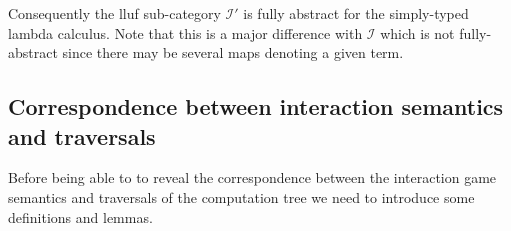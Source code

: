 Consequently the lluf sub-category $\mathcal{I'}$ is fully abstract for the simply-typed lambda calculus.
Note that this is a major difference with $\mathcal{I}$ which is not fully-abstract since there may be several maps denoting a given
term.




\subsection{Correspondence between interaction semantics and traversals}

Before being able to to reveal the correspondence between the
interaction game semantics and traversals of the computation tree we
need to introduce some definitions and lemmas.


%

